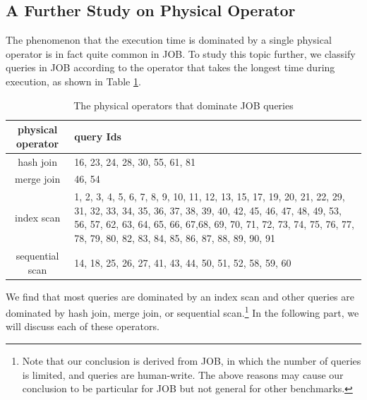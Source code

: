\subsection{A Further Study on Physical Operator} \label{S74}
    The phenomenon that the execution time is dominated by a single physical operator is in fact quite common in JOB. To study this topic further, we classify queries in JOB according to the operator that takes the longest time during execution, as shown in Table \ref{T5}.
    \begin{table}[htb]
        \caption{The physical operators that dominate JOB queries}
        \label{T5}
        \begin{tabular}{c|m{5cm}}
            \toprule
            physical operator & query Ids \\
            \hline
            hash join & 16, 23, 24, 28, 30, 55, 61, 81 \\
            \hline
            merge join & 46, 54 \\
            \hline
            index scan & 1, 2, 3, 4, 5, 6, 7, 8, 9, 10, 11, 12, 13, 15, 17, 19, 20, 21, 22, 29, 31, 32, 33, 34, 35, 36, 37, 38, 39, 40, 42, 45, 46, 47, 48, 49, 53, 56, 57, 62, 63, 64, 65, 66, 67,68, 69, 70, 71, 72, 73, 74, 75, 76, 77, 78, 79, 80, 82, 83, 84, 85, 86, 87, 88, 89, 90, 91 \\
            \hline
            sequential scan & 14, 18, 25, 26, 27, 41, 43, 44, 50, 51, 52, 58, 59, 60 \\
            \bottomrule
        \end{tabular}
    \end{table}\par
    We find that most queries are dominated by an index scan and other queries are dominated by hash join, merge join, or sequential scan.\footnote[4]{Note that our conclusion is derived from JOB, in which the number of queries is limited, and queries are human-write. The above reasons may cause our conclusion to be particular for JOB but not general for other benchmarks.} In the following part, we will discuss each of these operators.

